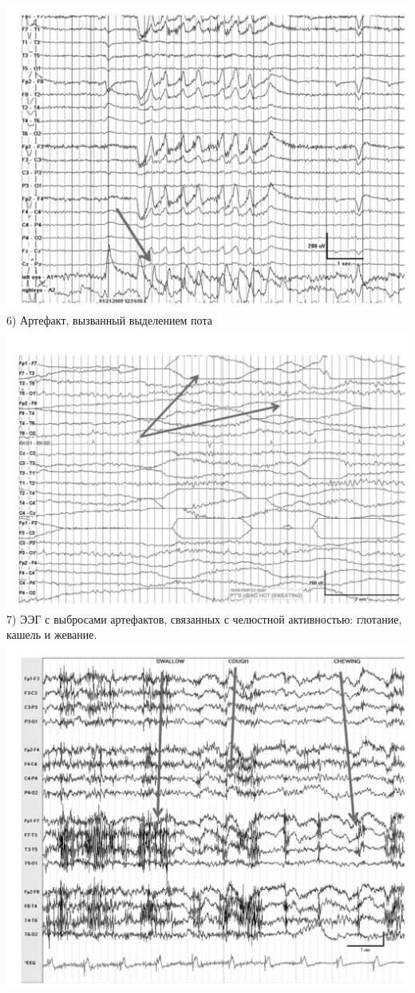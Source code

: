 \documentclass[12pt, a4paper, titlepage]{extreport}
\begin{document}
	\includegraphics[scale=0.75]{vertical_eye}\\
	6) Артефакт, вызванный выделением пота\\
	\includegraphics[scale=0.75]{sweat}\\
	7) ЭЭГ с выбросами артефактов, связанных с челюстной активностью: глотание, кашель и жевание.\\
	\includegraphics[scale=0.75]{myogenic}\\
	
\end{document}
